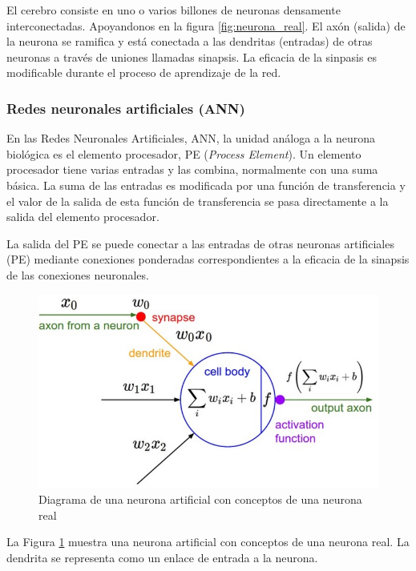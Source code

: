 \documentclass[runningheads]{llncs} %
\begin{document}
El cerebro consiste en uno o varios billones de neuronas densamente 
interconectadas. Apoyandonos en la figura \ref{fig:neurona_real}.
El axón (salida) de la neurona se ramifica y está conectada a las dendritas (entradas) 
de otras neuronas a través de uniones llamadas sinapsis.
La eficacia de la sinpasis es modificable durante el proceso de 
aprendizaje de la red. \cite{libro-def}

\subsubsection{Redes neuronales artificiales (ANN)}
En las Redes Neuronales Artificiales, ANN, la unidad análoga a la neurona biológica es
el elemento procesador, PE (\textit{Process Element}). Un elemento procesador tiene varias
entradas y las combina, normalmente con una suma básica. La suma de las entradas es
modificada por una función de transferencia y el valor de la salida de esta función de
transferencia se pasa directamente a la salida del elemento procesador.

La salida del PE se puede conectar a las entradas de otras neuronas artificiales (PE)
mediante conexiones ponderadas correspondientes a la eficacia de la sinapsis de las
conexiones neuronales. 

\begin{figure}
    \centering
    \includegraphics[scale=0.7]{neurona_artificial2.png}
    \caption{Diagrama de una neurona artificial con conceptos de una neurona real}
    \label{fig:neurona_artificial}
\end{figure}

La Figura \ref{fig:neurona_artificial} muestra una neurona artificial con conceptos
de una neurona real.
La dendrita se representa como un enlace de entrada a la neurona.
\end{document}
